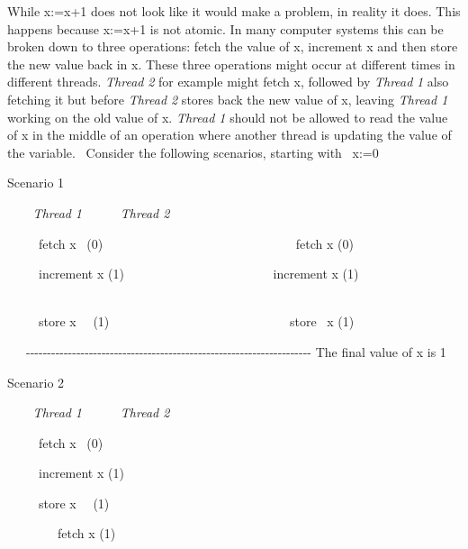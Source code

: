 While \textsf{x:=x+1} does not look like it would make a
problem, in reality it does. This happens because
\textsf{x:=x+1} is not atomic. In many computer systems this
can be broken down to three operations: fetch the value of
\textsf{x}, increment \textsf{x} and then store
the new value back in \textsf{x}. These three
operations might occur at different times in different threads.
\textit{Thread}\textit{ }\textit{2} for example might fetch
\textsf{x}, followed by \textit{Thread}\textit{
}\textit{1} also fetching it but before \textit{Thread 2} stores back
the new value of \textsf{x}, leaving \textit{Thread 1
}working on the old value of \textsf{x}. \textit{Thread
1 }should not be allowed to read the value of
\textsf{x} in the middle of an operation where another
thread is updating the value of the variable. \ Consider the following
scenarios, starting with \ \textsf{x:=0}\textsf{
}


\bigskip

Scenario 1

\textit{\ \ \ \ }\textit{Thread}\textit{
}\textit{1}\textit{\ \ \ \ \ \ }\textit{Thread 2}\textit{
}\textit{\ \ }\ \ 

\ \ \ \ \ fetch x \ (0)
\ \ \ \ \ \ \ \ \ \ \ \ \ \ \ \ \ \ \ \ \ \ \ \ \ \ \ \ \ \ fetch x (0)

\ \ \ \ \ increment x (1)
\ \ \ \ \ \ \ \ \ \ \ \ \ \ \ \ \ \ \ \ \ \ \ increment x (1)
\ \ \ \ \ \ \ \ \ \ \ \ \ \ \ \ \ \ \ 

\ \ \ \ \ store x \ \ (1)
\ \ \ \ \ \ \ \ \ \ \ \ \ \ \ \ \ \ \ \ \ \ \ \ \ \ \ \ store \ x (1)
\ 

\ \ \ {}-{}-{}-{}-{}-{}-{}-{}-{}-{}-{}-{}-{}-{}-{}-{}-{}-{}-{}-{}-{}-{}-{}-{}-{}-{}-{}-{}-{}-{}-{}-{}-{}-{}-{}-{}-{}-{}-{}-{}-{}-{}-{}-{}-{}-{}-{}-{}-{}-{}-{}-{}-{}-{}-{}-{}-{}-{}-{}-{}-{}-{}-{}-{}-{}-{}-{}-{}-
The final value of \textsf{x} is \textsf{1}


\bigskip

Scenario 2

\textit{\ \ \ \ }\textit{Thread}\textit{
}\textit{1}\textit{\ \ \ \ \ \ }\textit{Thread 2}\textit{
}\textit{\ \ \ \ }

\ \ \ \ \ fetch x \ (0) \ \ \ \ \ \ \ \ \ \ \ \ \ \ \ \ \ \ \ \ \ \ \ \ 

\ \ \ \ \ increment x (1) \ \ \ \ \ \ \ \ \ \ \ \ \ \ \ \ \ 

\ \ \ \ \ store x \ \ (1) \ \ \ \ \ \ \ \ \ \ \ \ \ \ \ \ \ \ \ \ \ \ \ 

\ \ \ \ \ \ \ \ fetch x (1)

